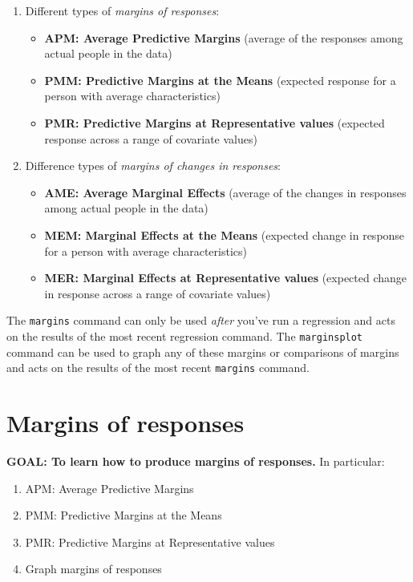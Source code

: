 \documentclass[
]{book}
\providecommand{\tightlist}{%
  \setlength{\itemsep}{0pt}\setlength{\parskip}{0pt}}
\begin{document}
\begin{enumerate}
\def\labelenumi{\arabic{enumi}.}
\tightlist
\item
  Different types of \emph{margins of responses}:

  \begin{itemize}
  \tightlist
  \item
    \textbf{APM: Average Predictive Margins} (average of the responses among actual people in the data)
  \item
    \textbf{PMM: Predictive Margins at the Means} (expected response for a person with average characteristics)
  \item
    \textbf{PMR: Predictive Margins at Representative values} (expected response across a range of covariate values)
  \end{itemize}
\item
  Difference types of \emph{margins of changes in responses}:

  \begin{itemize}
  \tightlist
  \item
    \textbf{AME: Average Marginal Effects} (average of the changes in responses among actual people in the data)
  \item
    \textbf{MEM: Marginal Effects at the Means} (expected change in response for a person with average characteristics)
  \item
    \textbf{MER: Marginal Effects at Representative values} (expected change in response across a range of covariate values)
  \end{itemize}
\end{enumerate}

The \texttt{margins} command can only be used \emph{after} you've run a regression and acts on the results of the most recent regression command. The \texttt{marginsplot} command can be used to graph any of these margins or comparisons of margins and acts on the results of the most recent \texttt{margins} command.

\hypertarget{margins-of-responses}{%
\section{Margins of responses}\label{margins-of-responses}}

\begin{alert}

\textbf{GOAL: To learn how to produce margins of responses.} In particular:

\begin{enumerate}
\def\labelenumi{\arabic{enumi}.}
\tightlist
\item
  APM: Average Predictive Margins\\
\item
  PMM: Predictive Margins at the Means
\item
  PMR: Predictive Margins at Representative values
\item
  Graph margins of responses
\end{enumerate}

\end{alert}
\end{document}
